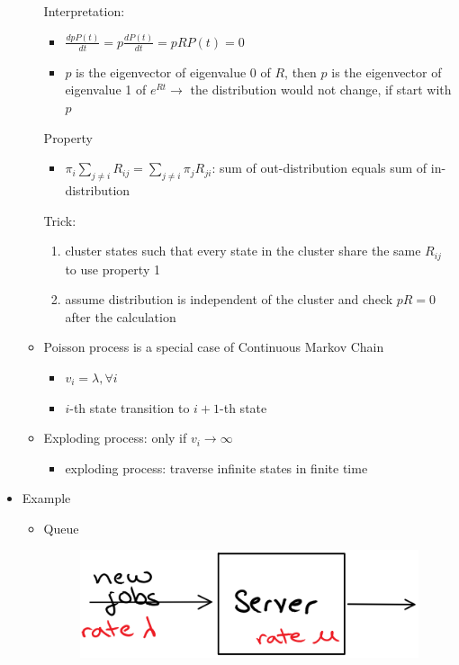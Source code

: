 \documentclass[a4paper]{article}
\begin{document}
\begin{itemize}
\begin{itemize}
                Interpretation:
                \begin{itemize}
                    \item $\frac{d p P(t)}{dt} = p \frac{d P(t)}{dt} = pR P(t) = 0$
                    \item $p$ is the eigenvector of eigenvalue 0 of $R$, then $p$ is the eigenvector of eigenvalue 1 of $e^{Rt} \rightarrow$ the distribution would not change, if start with $p$
                \end{itemize}
                Property
                \begin{itemize}
                    \item $\pi_i \sum_{j \not = i} R_{ij} = \sum_{j \not = i} \pi_j R_{ji}$: sum of out-distribution equals sum of in-distribution
                \end{itemize}
                Trick:
                \begin{enumerate}
                    \item cluster states such that every state in the cluster share the same $R_{ij}$ to use property 1
                    \item assume distribution is independent of the cluster and check $p R = 0$ after the calculation
                \end{enumerate}
            \item Poisson process is a special case of Continuous Markov Chain
                \begin{itemize}
                    \item $v_i = \lambda, \forall i$
                    \item $i$-th state transition to $i+1$-th state
                \end{itemize}
            \item Exploding process: only if $v_i \rightarrow \infty$
                \begin{itemize}
                    \item exploding process: traverse infinite states in finite time
                \end{itemize}
        \end{itemize}
    \item Example
        \begin{itemize}
            \item Queue
            \begin{figure} [H]
                \includegraphics[width=0.3\linewidth, center]{image/queue.png}

\end{figure}
\end{itemize}
\end{itemize}
\end{document}
